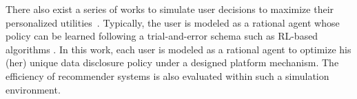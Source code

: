There also exist a series of works to simulate user decisions to maximize their personalized utilities~\cite{jiang2017information,samadi2012advanced,kallstrom2019tunable}.
Typically, the user is modeled as a rational agent whose policy can be learned following a trial-and-error schema such as RL-based algorithms \cite{katehakis1987multi,kallstrom2019tunable}.
In this work, each user is modeled as a rational agent to optimize his (her) unique data disclosure policy under a designed platform mechanism. The efficiency of recommender systems is also evaluated within such a simulation environment.







